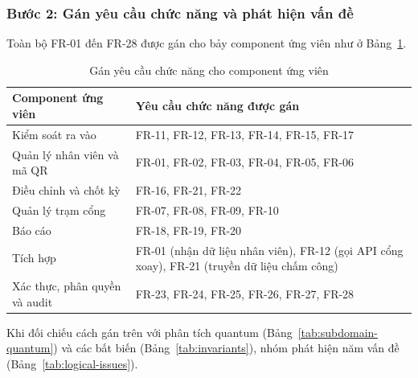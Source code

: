 \subsubsection{Bước 2: Gán yêu cầu chức năng và phát hiện vấn đề}\label{sec:logical-step2}
Toàn bộ FR-01 đến FR-28 được gán cho bảy component ứng viên như ở Bảng~\ref{tab:candidate-fr}.

\begin{table}[H]
\centering
\caption{Gán yêu cầu chức năng cho component ứng viên}\label{tab:candidate-fr}
\small
\renewcommand{\arraystretch}{1.3}
\begin{tabularx}{\textwidth}{|>{\raggedright\arraybackslash}p{5cm}|>{\raggedright\arraybackslash}X|}
\hline
\textbf{Component ứng viên} & \textbf{Yêu cầu chức năng được gán} \\
\hline
Kiểm soát ra vào & FR-11, FR-12, FR-13, FR-14, FR-15, FR-17 \\
\hline
Quản lý nhân viên và mã QR & FR-01, FR-02, FR-03, FR-04, FR-05, FR-06 \\
\hline
Điều chỉnh và chốt kỳ & FR-16, FR-21, FR-22 \\
\hline
Quản lý trạm cổng & FR-07, FR-08, FR-09, FR-10 \\
\hline
Báo cáo & FR-18, FR-19, FR-20 \\
\hline
Tích hợp & FR-01 (nhận dữ liệu nhân viên), FR-12 (gọi API cổng xoay), FR-21 (truyền dữ liệu chấm công) \\
\hline
Xác thực, phân quyền và audit & FR-23, FR-24, FR-25, FR-26, FR-27, FR-28 \\
\hline
\end{tabularx}
\end{table}

Khi đối chiếu cách gán trên với phân tích quantum (Bảng~\ref{tab:subdomain-quantum}) và các bất biến (Bảng~\ref{tab:invariants}), nhóm phát hiện năm vấn đề (Bảng~\ref{tab:logical-issues}).

